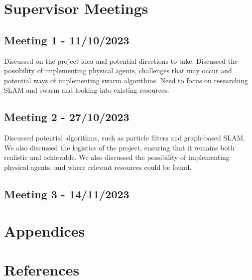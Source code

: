 \documentclass[12pt]{article}
\begin{document}
\section{Supervisor Meetings}
\subsection{Meeting 1 - 11/10/2023}
Discussed on the project idea and potential directions to take. Discussed the possibility of implementing physical agents,
challenges that may occur and potential ways of implementing swarm algorithms. Need to focus on researching SLAM and swarm
and looking into existing resources.
\subsection{Meeting 2 - 27/10/2023}
Discussed potential algorithms, such as particle filters and graph-based SLAM. We also discussed the logistics of the project,
ensuring that it remains both realistic and achievable. We also discussed the possibility of implementing physical agents,
and where relevant resources could be found.
\subsection{Meeting 3 - 14/11/2023}

\section{Appendices}

\section{References}
\end{document}
